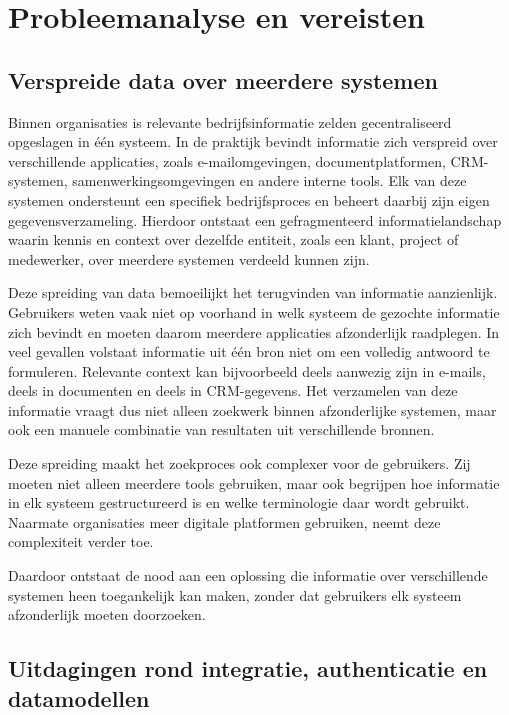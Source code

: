 \chapter{Probleemanalyse en vereisten}
\label{chap:probleemanalyse}

\section{Verspreide data over meerdere systemen}
\label{sec:verspreide-data}

Binnen organisaties is relevante bedrijfsinformatie zelden gecentraliseerd opgeslagen in één systeem. In de praktijk bevindt informatie zich verspreid over verschillende applicaties, zoals e-mailomgevingen, documentplatformen, \gls{CRM}-systemen, samenwerkingsomgevingen en andere interne tools. Elk van deze systemen ondersteunt een specifiek bedrijfsproces en beheert daarbij zijn eigen gegevensverzameling. Hierdoor ontstaat een gefragmenteerd informatielandschap waarin kennis en context over dezelfde entiteit, zoals een klant, project of medewerker, over meerdere systemen verdeeld kunnen zijn.

Deze spreiding van data bemoeilijkt het terugvinden van informatie aanzienlijk. Gebruikers weten vaak niet op voorhand in welk systeem de gezochte informatie zich bevindt en moeten daarom meerdere applicaties afzonderlijk raadplegen. In veel gevallen volstaat informatie uit één bron niet om een volledig antwoord te formuleren. Relevante context kan bijvoorbeeld deels aanwezig zijn in e-mails, deels in documenten en deels in \gls{CRM}-gegevens. Het verzamelen van deze informatie vraagt dus niet alleen zoekwerk binnen afzonderlijke systemen, maar ook een manuele combinatie van resultaten uit verschillende bronnen.

Deze spreiding maakt het zoekproces ook complexer voor de gebruikers. Zij moeten niet alleen meerdere tools gebruiken, maar ook begrijpen hoe informatie in elk systeem gestructureerd is en welke terminologie daar wordt gebruikt. Naarmate organisaties meer digitale platformen gebruiken, neemt deze complexiteit verder toe.

Daardoor ontstaat de nood aan een oplossing die informatie over verschillende systemen heen toegankelijk kan maken, zonder dat gebruikers elk systeem afzonderlijk moeten doorzoeken.

\section{Uitdagingen rond integratie, authenticatie en datamodellen}
\label{sec:integratie-uitdagingen}

